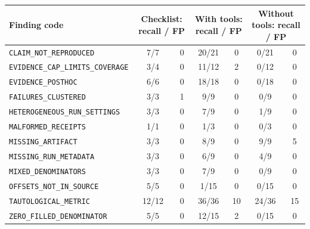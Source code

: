 \begin{tabular}{@{}lcccccc@{}}
\toprule
Finding code & \multicolumn{2}{c}{Checklist: recall / FP} & \multicolumn{2}{c}{With tools: recall / FP} & \multicolumn{2}{c}{Without tools: recall / FP} \\
\midrule
\texttt{CLAIM\_NOT\_REPRODUCED} & 7/7 & 0 & 20/21 & 0 & 0/21 & 0 \\
\texttt{EVIDENCE\_CAP\_LIMITS\_COVERAGE} & 3/4 & 0 & 11/12 & 2 & 0/12 & 0 \\
\texttt{EVIDENCE\_POSTHOC} & 6/6 & 0 & 18/18 & 0 & 0/18 & 0 \\
\texttt{FAILURES\_CLUSTERED} & 3/3 & 1 & 9/9 & 0 & 0/9 & 0 \\
\texttt{HETEROGENEOUS\_RUN\_SETTINGS} & 3/3 & 0 & 7/9 & 0 & 1/9 & 0 \\
\texttt{MALFORMED\_RECEIPTS} & 1/1 & 0 & 1/3 & 0 & 0/3 & 0 \\
\texttt{MISSING\_ARTIFACT} & 3/3 & 0 & 8/9 & 0 & 9/9 & 5 \\
\texttt{MISSING\_RUN\_METADATA} & 3/3 & 0 & 6/9 & 0 & 4/9 & 0 \\
\texttt{MIXED\_DENOMINATORS} & 3/3 & 0 & 7/9 & 0 & 0/9 & 0 \\
\texttt{OFFSETS\_NOT\_IN\_SOURCE} & 5/5 & 0 & 1/15 & 0 & 0/15 & 0 \\
\texttt{TAUTOLOGICAL\_METRIC} & 12/12 & 0 & 36/36 & 10 & 24/36 & 15 \\
\texttt{ZERO\_FILLED\_DENOMINATOR} & 5/5 & 0 & 12/15 & 2 & 0/15 & 0 \\
\bottomrule
\end{tabular}
